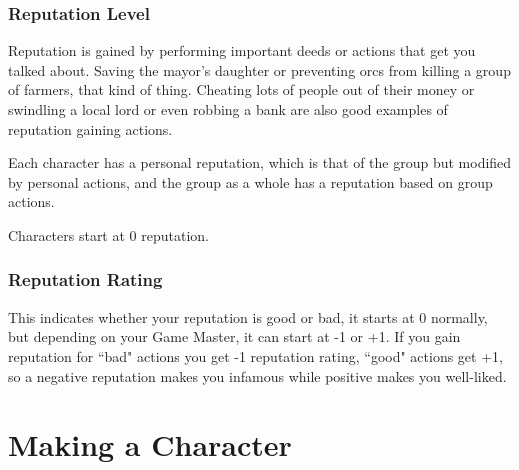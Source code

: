 \documentclass[a4paper,10pt,oneside]{book}
\begin{document}
\subsection{Reputation Level}
Reputation is gained by performing important deeds or actions that get you talked about. Saving the mayor's daughter or preventing orcs from killing a group of farmers, that kind of thing. Cheating lots of people out of their money or swindling a local lord or even robbing a bank are also good examples of reputation gaining actions.

Each character has a personal reputation, which is that of the group but modified by personal actions, and the group as a whole has a reputation based on group actions.

Characters start at 0 reputation.

\subsection{Reputation Rating}
This indicates whether your reputation is good or bad, it starts at 0 normally, but depending on your Game Master, it can start at -1 or +1. If you gain reputation for ``bad" actions you get -1 reputation rating, ``good" actions get +1, so a negative reputation makes you infamous while positive makes you well-liked.





\chapter{Making a Character}
\end{document}
